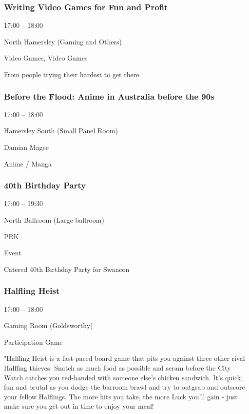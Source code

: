\documentclass{scrreprt}
\begin{document}
\begin{multicols}{2}
\subsubsection*{Writing Video Games for Fun and Profit}\begin{description}
\setlength{\itemsep}{0pt}
\setlength{\parsep}{0pt}
\setlength{\parskip}{0pt}
\item[Time:]{17:00 -- 18:00}
\item[Venue:]{North Hamersley (Gaming and Others)}
\item[Tags:]{Video Games, Video Games}\end{description}
From people trying their hardest to get there.
\subsubsection*{Before the Flood: Anime in Australia before the 90s}\begin{description}
\setlength{\itemsep}{0pt}
\setlength{\parsep}{0pt}
\setlength{\parskip}{0pt}
\item[Time:]{17:00 -- 18:00}
\item[Venue:]{Hamersley South (Small Panel Room)}
\item[People:]{Damian Magee}
\item[Tags:]{Anime / Manga}\end{description}

\subsubsection*{40th Birthday Party}\begin{description}
\setlength{\itemsep}{0pt}
\setlength{\parsep}{0pt}
\setlength{\parskip}{0pt}
\item[Time:]{17:00 -- 19:30}
\item[Venue:]{North Ballroom (Large ballroom)}
\item[People:]{PRK}
\item[Tags:]{Event}\end{description}
Catered 40th Birthday Party for Swancon
\subsubsection*{Halfling Heist}\begin{description}
\setlength{\itemsep}{0pt}
\setlength{\parsep}{0pt}
\setlength{\parskip}{0pt}
\item[Time:]{17:00 -- 18:00}
\item[Venue:]{Gaming Room (Goldsworthy)}
\item[Tags:]{Participation Game}\end{description}
"Halfling Heist is a fast-paced board game that pits you against three other rival Halfling thieves. Snatch as much food as possible and scram before the City Watch catches you red-handed with someone else’s chicken sandwich. It’s quick, fun and brutal as you dodge the barroom brawl and try to outgrab and outscore your fellow Halflings. The more hits you take, the more Luck you’ll gain - just make sure you get out in time to enjoy your meal!

\end{multicols}
\end{document}
